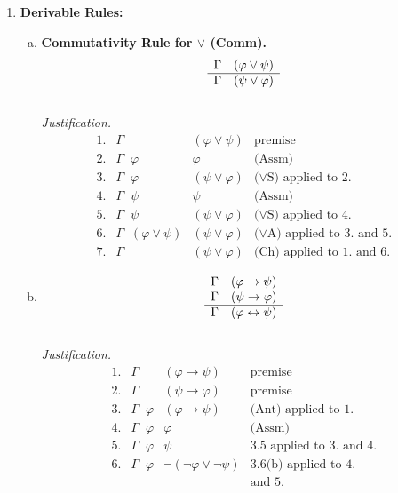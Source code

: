 \begin{enumerate}[1.]
%
\item \textbf{Derivable Rules:}
\begin{enumerate}[(a)]
\item \textbf{Commutativity Rule for $\lor$ (Comm).}
\[
\begin{array}{ll}
\Gamma & (\varphi \lor \psi) \cr \hline
\Gamma & (\psi \lor \varphi)
\end{array}
\]
\\
\textit{Justification.}
\[
\begin{array}{llll}
1. & \Gamma & (\varphi \lor \psi) & \mbox{premise} \\
2. & \Gamma \;\; \varphi & \varphi & \mbox{(Assm)} \\
3. & \Gamma \;\; \varphi & (\psi \lor \varphi) & \mbox{($\lor$S) applied to 2.} \\
4. & \Gamma \;\; \psi & \psi & \mbox{(Assm)} \\
5. & \Gamma \;\; \psi & (\psi \lor \varphi) & \mbox{($\lor$S) applied to 4.} \\
6. & \Gamma \;\; (\varphi \lor \psi) & (\psi \lor \varphi) & \mbox{($\lor$A) applied to 3. and 5.} \\
7. & \Gamma & (\psi \lor \varphi) & \mbox{(Ch) applied to 1. and 6.}
\end{array}
\]
\item
\[
\begin{array}{ll}
\Gamma & (\varphi \rightarrow \psi) \cr
\Gamma & (\psi \rightarrow \varphi) \cr \hline
\Gamma & (\varphi \leftrightarrow \psi)
\end{array}
\]
\\
\textit{Justification.}
\[
\begin{array}{llll}
1. & \Gamma & (\varphi \rightarrow \psi) & \mbox{premise} \\
2. & \Gamma & (\psi \rightarrow \varphi) & \mbox{premise} \\
3. & \Gamma \;\; \varphi & (\varphi \rightarrow \psi) & \mbox{(Ant) applied to 1.} \\
4. & \Gamma \;\; \varphi & \varphi & \mbox{(Assm)} \\
5. & \Gamma \;\; \varphi & \psi & \mbox{3.5 applied to 3. and 4.} \\
6. & \Gamma \;\; \varphi & \neg (\neg \varphi \lor \neg \psi) & \mbox{3.6(b) applied to 4.} \\
\  & \                   & \                                  & \mbox{and 5.} \\

\end{array}\]
\end{enumerate}
\end{enumerate}
